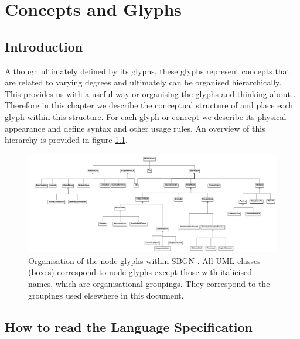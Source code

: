 
\chapter{Concepts and Glyphs}
\label{chp:glyphs}


\section{Introduction}

Although ultimately defined by its glyphs, \SBGNPDLone these glyphs
represent concepts that are related to varying degrees and ultimately
can be organised hierarchically. This provides us with a useful way or
organising the glyphs and thinking about \PD{}.  Therefore in this
chapter we describe the conceptual structure of \SBGNPDLone and place
each glyph within this structure. For each glyph or concept we describe its
physical appearance and define syntax and other usage rules. An
overview of this hierarchy is provided in figure
\ref{fig:sbgn_node_tax}.

\begin{figure}[htb]
\begin{center}
\includegraphics[width=1.0\linewidth]{images/sbgnumloverview}
\caption{Organisation of the node glyphs within SBGN \PDl. All UML classes (boxes) correspond to \PD node glyphs except those with italicised names, which are organisational groupings. They correspond to the groupings used elsewhere in this document.}
\label{fig:sbgn_node_tax}
\end{center}
\end{figure}


\section{How to read the Language Specification}

